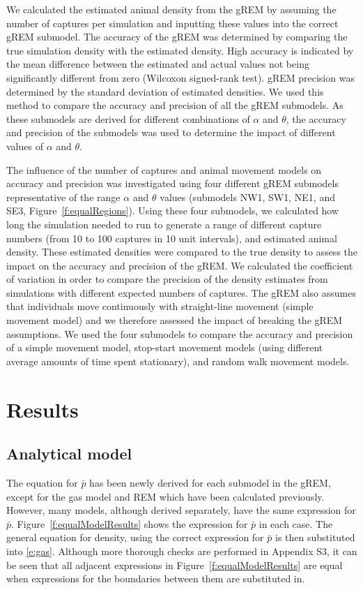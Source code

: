 \documentclass[a4paper,10pt,reqno,oneside]{amsart}
\begin{document}
We calculated the estimated animal density from the gREM by assuming the number of captures per simulation and inputting these values into the correct gREM submodel. The accuracy of the gREM was determined by comparing the true simulation density with the estimated density. High accuracy is indicated by the mean difference between the estimated and actual values not being significantly different from zero (Wilcoxon signed-rank test). gREM precision was determined by the standard deviation of estimated densities. We used this method to compare the accuracy and precision of all the gREM submodels. As these submodels are derived for different combinations of $\alpha$ and $\theta$, the accuracy and precision of the submodels was used to determine the impact of different values of $\alpha$ and $\theta$. 

The influence of the number of captures and animal movement models on accuracy and precision was investigated using four different gREM submodels representative of the range $\alpha$ and $\theta$ values (submodels NW1, SW1, NE1, and SE3, Figure~\ref{f:equalRegions}). Using these four submodels, we calculated how long the simulation needed to run to generate a range of different capture numbers (from 10 to 100 captures in 10 unit intervals), and estimated animal density. These estimated densities were compared to the true density to assess the impact on the accuracy and precision of the gREM. We calculated the coefficient of variation in order to compare the precision of the density estimates from simulations with different expected numbers of captures. The gREM also assumes that individuals move continuously with straight-line movement (simple movement model) and we therefore assessed the impact of breaking the gREM assumptions. We used the four submodels to compare the accuracy and precision of a simple movement model, stop-start movement models (using different average amounts of time spent stationary), and random walk movement models.

\section*{Results}

\subsection*{Analytical model}

The equation for $\bar{p}$ has been newly derived for each submodel in the gREM, except for the gas model and REM which have been calculated previously. However, many models, although derived separately, have the same expression for $\bar{p}$. Figure~\ref{f:equalModelResults} shows the expression for $\bar{p}$ in each case. The general equation for density, using the correct expression for $\bar{p}$ is then substituted into \ref{e:gas}. Although more thorough checks are performed in Appendix S3, it can be seen that all adjacent expressions in Figure~\ref{f:equalModelResults} are equal when expressions for the boundaries between them are substituted in.
\end{document}
